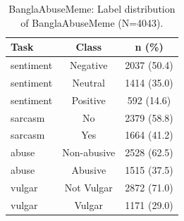 \begin{table}[t]
\centering
\small
\caption{BanglaAbuseMeme: Label distribution of BanglaAbuseMeme (N=4043).}
\label{tab:data_banglaabusememe}
\begin{tabular}{lcc}
\toprule
Task & Class & n (\%) \\
\midrule
sentiment & Negative & 2037 (50.4) \\
sentiment & Neutral & 1414 (35.0) \\
sentiment & Positive & 592 (14.6) \\
sarcasm & No & 2379 (58.8) \\
sarcasm & Yes & 1664 (41.2) \\
abuse & Non-abusive & 2528 (62.5) \\
abuse & Abusive & 1515 (37.5) \\
vulgar & Not Vulgar & 2872 (71.0) \\
vulgar & Vulgar & 1171 (29.0) \\
\bottomrule
\end{tabular}
\end{table}
